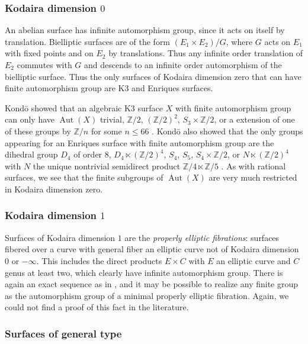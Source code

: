 \documentclass[11pt]{article}
\theoremstyle{plain}
\theoremstyle{definition}
\theoremstyle{remark}
\newcommand{\bbZ}{\mathbb{Z}}
\DeclareMathOperator{\Aut}{Aut}
\begin{document}
\subsubsection*{Kodaira dimension $0$}

An abelian surface has infinite automorphism group, since it acts on itself by translation. Bielliptic surfaces are of the form $(E_1 \times E_2) / G$, where $G$ acts on $E_1$ with fixed points and on $E_2$ by translations. Thus any infinite order translation of $E_2$ commutes with $G$ and descends to an infinite order automorphism of the bielliptic surface. Thus the only surfaces of Kodaira dimension zero that can have finite automorphism group are K3 and Enriques surfaces.

Kond\={o} showed that an algebraic K3 surface $X$ with finite automorphism group can only have $\Aut(X)$ trivial, $\bbZ / 2$, $(\bbZ / 2)^2$, $S_3 \times \bbZ / 2$, or a extension of one of these groups by $\bbZ / n$ for some $n \le 66$ \cite[p.\ 2]{KondoK3}. Kond\={o} also showed that the only groups appearing for an Enriques surface with finite automorphism group are the dihedral group $D_4$ of order $8$, $D_4 \ltimes (\bbZ / 2)^4$, $S_4$, $S_5$, $S_4 \times \bbZ / 2$, or $N \ltimes (\bbZ / 2)^4$ with $N$ the unique nontrivial semidirect product $\bbZ / 4 \ltimes \bbZ / 5$ \cite[Main Thm.]{KondoEnriques}. As with rational surfaces, we see that the finite subgroups of $\Aut(X)$ are very much restricted in Kodaira dimension zero.

\subsubsection*{Kodaira dimension $1$}

Surfaces of Kodaira dimension $1$ are the \emph{properly elliptic fibrations}: surfaces fibered over a curve with general fiber an elliptic curve not of Kodaira dimension $0$ or $-\infty$. This includes the direct products $E \times C$ with $E$ an elliptic curve and $C$ genus at least two, which clearly have infinite automorphism group. There is again an exact sequence as in , and it may be possible to realize any finite group as the automorphism group of a minimal properly elliptic fibration. Again, we could not find a proof of this fact in the literature.

\subsubsection*{Surfaces of general type}
\end{document}
